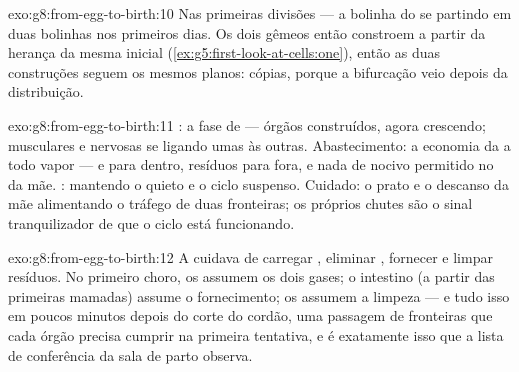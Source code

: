 \begin{solution}{exo:g8:from-egg-to-birth:10}
Nas primeiras divisões --- a bolinha do  se partindo em duas
bolinhas nos primeiros dias. Os dois gêmeos então constroem a partir
da herança da mesma  inicial
(\cref{ex:g5:first-look-at-cells:one}), então as duas construções
seguem os mesmos planos: cópias, porque a bifurcação veio depois da
distribuição.
\end{solution}

\begin{solution}{exo:g8:from-egg-to-birth:11}
: a fase de  --- órgãos construídos, agora crescendo;
 musculares e nervosas se ligando umas às outras.
Abastecimento: a economia da  a todo vapor ---  e
 para dentro, resíduos para fora, e nada de nocivo permitido
no  da mãe. : mantendo o  quieto e o ciclo
suspenso. Cuidado: o prato e o descanso da mãe alimentando o tráfego
de duas fronteiras; os próprios chutes são o sinal tranquilizador de
que o ciclo está funcionando.
\end{solution}

\begin{solution}{exo:g8:from-egg-to-birth:12}
A  cuidava de carregar , eliminar ,
fornecer  e limpar resíduos. No primeiro choro, os 
assumem os dois gases; o intestino (a partir das primeiras mamadas)
assume o fornecimento; os  assumem a limpeza --- e tudo isso em
poucos minutos depois do corte do cordão, uma passagem de fronteiras
que cada órgão precisa cumprir na primeira tentativa, e é exatamente
isso que a lista de conferência da sala de parto observa.
\end{solution}

